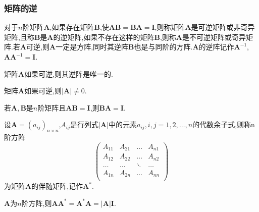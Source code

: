 \subsubsection{矩阵的逆}
\begin{definition}
    对于$n$阶矩阵$\mathbf{A}$,如果存在矩阵$\mathbf{B}$,使$\mathbf{A}\mathbf{B}=\mathbf{B}\mathbf{A}=\mathbf{I} $,则称矩阵$\mathbf{A}$是可逆矩阵或非奇异矩阵,且称$\mathbf{B}$是$\mathbf{A}$的逆矩阵,如果不存在这样的矩阵$\mathbf{B}$,则称$\mathbf{A}$是不可逆矩阵或奇异矩阵.若$\mathbf{A}$可逆,则$\mathbf{A}$一定是方阵,同时其逆阵$\mathbf{B}$也是与同阶的方阵.$\mathbf{A}$的逆阵记作$\mathbf{A}^{-1}$,$\mathbf{A}\mathbf{A}^{-1}=\mathbf{I}$.
\end{definition}

\begin{ttheorem}
    矩阵$\mathbf{A}$如果可逆,则其逆阵是唯一的.
\end{ttheorem}

\begin{ttheorem}
    矩阵$\mathbf{A}$如果可逆,则$\left\lvert \mathbf{A} \right\rvert\neq 0$.
\end{ttheorem}

\begin{ttheorem}
    若$\mathbf{A},\mathbf{B}$是$n$阶矩阵且$\mathbf{A}\mathbf{B}=\mathbf{I}$,则$\mathbf{B}\mathbf{A}=\mathbf{I}$.
\end{ttheorem}

\begin{definition}
    设$\mathbf{A}=(a_{ij})_{n\times n}$,$A_{ij}$是行列式$\left\lvert \mathbf{A} \right\rvert$中的元素$a_{ij},i,j=1,2,\dots,n$的代数余子式,则称n阶方阵
    \begin{equation*}
        \begin{pmatrix}
        A_{11}   &   A_{21}   &   \dots   &   A_{n1}   \\
        A_{12}   &   A_{22}   &   \dots   &   A_{n2}   \\
        \dots   &   \dots   &   \ddots   &   \dots   \\
        A_{1n}   &   A_{2n}   &   \dots   &   A_{nn}   \\
        \end{pmatrix}
    \end{equation*}
    为矩阵$\mathbf{A}$的伴随矩阵,记作$\mathbf{A}^*$.
\end{definition}

\begin{ttheorem}
    $\mathbf{A}$为$n$阶方阵,则$\mathbf{A}\mathbf{A}^*=\mathbf{A}^*\mathbf{A}=\left\lvert \mathbf{A} \right\rvert\mathbf{I} $.
\end{ttheorem}


